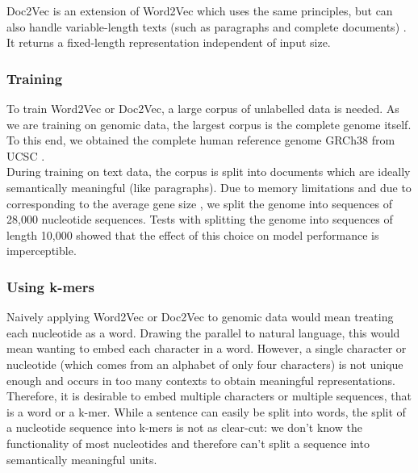 


Doc2Vec is an extension of Word2Vec which uses the same principles, but can also handle variable-length texts (such as paragraphs and complete documents) \cite{d2v1} \cite{d2v2}. It returns a fixed-length representation independent of input size.

\subsubsection{Training}
To train Word2Vec or Doc2Vec, a large corpus of unlabelled data is needed. As we are training on genomic data, the largest corpus is the complete genome itself. To this end, we obtained the complete human reference genome GRCh38 from UCSC \cite{ucsc}.\\ %
During training on text data, the corpus is split into documents which are ideally semantically meaningful (like paragraphs). Due to memory limitations and due to corresponding to the average gene size \cite{bionumbers}, we split the genome into sequences of 28,000 nucleotide sequences. Tests with splitting the genome into sequences of length 10,000 showed that the effect of this choice on model performance is imperceptible. 
\subsubsection{Using k-mers}\label{subsubsec:kmers}
Naively applying Word2Vec or Doc2Vec to genomic data would mean treating each nucleotide as a word. Drawing the parallel to natural language, this would mean wanting to embed each character in a word. However, a single character or nucleotide (which comes from an alphabet of only four characters) is not unique enough and occurs in too many contexts to obtain meaningful representations. Therefore, it is desirable to embed multiple characters or multiple sequences, that is a word or a k-mer. While a sentence can easily be split into words, the split of a nucleotide sequence into k-mers is not as clear-cut: we don't know the functionality of most nucleotides and therefore can't split a sequence into semantically meaningful units.

